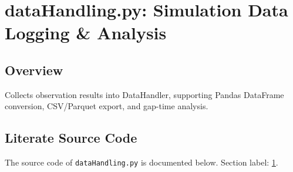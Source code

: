 \documentclass[10pt,a4paper]{report}
\begin{document}
\chapter{dataHandling.py: Simulation Data Logging \& Analysis}
\label{sec:datahandling}

\section*{Overview}
Collects observation results into DataHandler, supporting Pandas DataFrame conversion, CSV/Parquet export, and gap-time analysis.

\section*{Literate Source Code}
The source code of \texttt{dataHandling.py} is documented below. Section label: \ref{sec:datahandling}.
\end{document}

